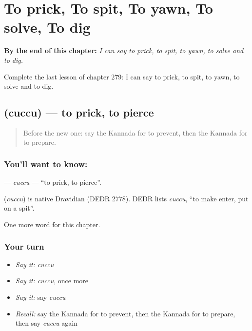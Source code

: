 
\chapter{To prick, To spit, To yawn, To solve, To dig}
\label{ch:ka-to-prick-to-spit-to-yawn-to-solve-to-dig}

\begin{chapteropening}
\textbf{By the end of this chapter:} \emph{I can say to prick, to spit, to yawn, to solve and to dig.}

Complete the last lesson of chapter 279: I can say to prick, to spit, to yawn, to solve and to dig.
\end{chapteropening}

\section[\texorpdfstring{\kn{ಚುಚ್ಚು} (cuccu)}{ಚುಚ್ಚು (cuccu)}]{ (cuccu) — to prick, to pierce}

\label{lesson:KA-C279-cuccu}



\begin{quote}
Before the new one: say the Kannada for to prevent, then the Kannada for to prepare.
\end{quote}

\subsection*{You'll want to know: }
\textbf{} — \emph{cuccu} — \textquotedblleft{}to prick, to pierce\textquotedblright{}.

\begin{cousinweb}
\textbf{} (\emph{cuccu}) is native Dravidian (DEDR 2778). DEDR lists \emph{cuccu}, \textquotedblleft{}to make enter, put on a spit\textquotedblright{}.
\end{cousinweb}

\begin{grammarlens}[title={What you've built}]
One more word for this chapter.
\end{grammarlens}

\subsection*{Your turn}
\begin{itemize}
\raggedright
  \item \emph{Say it:} \emph{cuccu}
  \item \emph{Say it:} \emph{cuccu}, once more
  \item \emph{Say it:} say \emph{cuccu}
  \item \emph{Recall:} say the Kannada for to prevent, then the Kannada for to prepare, then say \emph{cuccu} again
\end{itemize}

